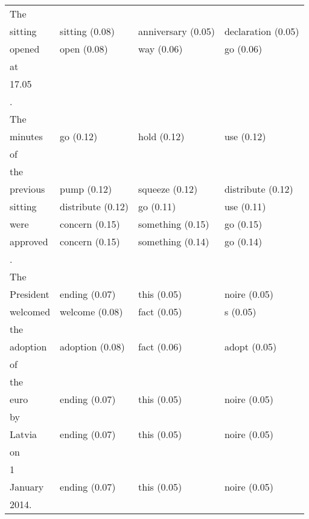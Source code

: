 \documentclass[11pt,twoside,openright]{mpreport}
\begin{document}
\hspace{-0cm}\begin{footnotesize}\begin{tabular}{|llll|}
\hline
The & & & \\
sitting                 & sitting (0.08) & anniversary (0.05) & declaration (0.05) \\
opened                  & open (0.08) & way (0.06) & go (0.06) \\
at & & & \\
17.05 & & & \\
. & & & \\
The & & & \\
minutes                 & go (0.12) & hold (0.12) & use (0.12) \\
of & & & \\
the & & & \\
previous                & pump (0.12) & squeeze (0.12) & distribute (0.12) \\
sitting                 & distribute (0.12) & go (0.11) & use (0.11) \\
were                    & concern (0.15) & something (0.15) & go (0.15) \\
approved                & concern (0.15) & something (0.14) & go (0.14) \\
. & & & \\
The & & & \\
President               & ending (0.07) & this (0.05) & noire (0.05) \\
welcomed                & welcome (0.08) & fact (0.05) & s (0.05) \\
the & & & \\
adoption                & adoption (0.08) & fact (0.06) & adopt (0.05) \\
of & & & \\
the & & & \\
euro                    & ending (0.07) & this (0.05) & noire (0.05) \\
by & & & \\
Latvia                  & ending (0.07) & this (0.05) & noire (0.05) \\
on & & & \\
1 & & & \\
January                 & ending (0.07) & this (0.05) & noire (0.05) \\
2014. & & & \\
\hline
\end{tabular}\end{footnotesize}\\
\end{document}

